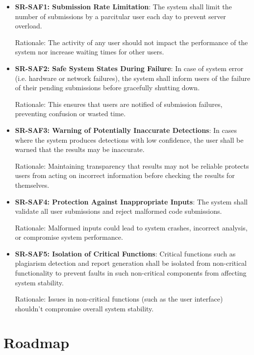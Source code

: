 \documentclass{article}
\begin{document}
\begin{itemize}
\item \label{req:saf1} \textbf{SR-SAF1: Submission Rate Limitation}: The system shall limit the number of submissions by a parcitular user each day to prevent server overload.

Rationale: The activity of any user should not impact the performance of the system nor increase waiting times for other users.

\item \label{req:saf2} \textbf{SR-SAF2: Safe System States During Failure}: In case of system error (i.e. hardware or network failures), the system shall inform users of the failure of their pending submissions before gracefully shutting down.

Rationale: This ensures that users are notified of submission failures, preventing confusion or wasted time.

\item \label{req:saf3} \textbf{SR-SAF3: Warning of Potentially Inaccurate Detections}: In cases where the system produces detections with low confidence, the user shall be warned that the results may be inaccurate.

Rationale: Maintaining transparency that results may not be reliable protects users from acting on incorrect information before checking the results for themselves.

\item \label{req:saf4} \textbf{SR-SAF4: Protection Against Inappropriate Inputs}: The system shall validate all user submissions and reject malformed code submissions.

Rationale: Malformed inputs could lead to system crashes, incorrect analysis, or compromise system performance.

\item \label{req:saf5} \textbf{SR-SAF5: Isolation of Critical Functions}: Critical functions such as plagiarism detection and report generation shall be isolated from non-critical functionality to prevent faults in such non-critical components from affecting system stability.

Rationale: Issues in non-critical functions (such as the user interface) shouldn't compromise overall system stability.

\end{itemize}

\section{Roadmap}
\end{document}
